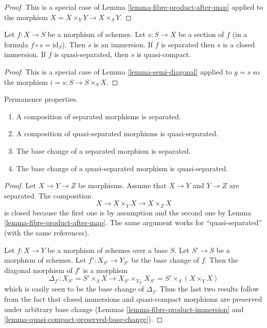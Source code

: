 \begin{proof}
This is a special case of Lemma \ref{lemma-fibre-product-after-map}
applied to the morphism $X = X \times_Y Y \to X\times_S Y$.
\end{proof}

\begin{lemma}
\label{lemma-section-immersion}
Let $f : X \to S$ be a morphism of schemes.
Let $s : S \to X$ be a section of $f$ (in a formula $f \circ s = \text{id}_S$).
Then $s$ is an immersion.
If $f$ is separated then $s$ is a closed immersion.
If $f$ is quasi-separated, then $s$ is quasi-compact.
\end{lemma}

\begin{proof}
This is a special case of Lemma \ref{lemma-semi-diagonal} applied to
$g =s$ so the morphism $i = s : S \to S \times_S X$.
\end{proof}

\begin{lemma}
\label{lemma-separated-permanence}
Permanence properties.
\begin{enumerate}
\item A composition of separated morphisms is separated.
\item A composition of quasi-separated morphisms is quasi-separated.
\item The base change of a separated morphism is separated.
\item The base change of a quasi-separated morphism is quasi-separated.
\end{enumerate}
\end{lemma}

\begin{proof}
Let $X \to Y \to Z$ be morphisms. Assume that $X \to Y$ and
$Y \to Z$ are separated. The composition
$$
X \to X \times_Y X \to X \times_Z X
$$
is closed because the first one is by assumption and the second
one by Lemma \ref{lemma-fibre-product-after-map}. The same argument
works for ``quasi-separated'' (with the same references).

\medskip\noindent
Let $f : X \to Y$ be a morphism of schemes over a base $S$.
Let $S' \to S$ be a morphism of schemes. Let $f' : X_{S'} \to Y_{S'}$
be the base change of $f$. Then the diagonal morphism
of $f'$ is a morphism
$$
\Delta_{f'} :
X_{S'} = S' \times_S X
\longrightarrow
X_{S'} \times_{Y_{S'}} X_{S'} = S' \times _S (X \times_Y X)
$$
which is easily seen to be the base change of $\Delta_f$.
Thus the last two results follow from the fact that
closed immersions and quasi-compact morphisms are preserved
under arbitrary base change (Lemmas
\ref{lemma-fibre-product-immersion} and
\ref{lemma-quasi-compact-preserved-base-change}).
\end{proof}


